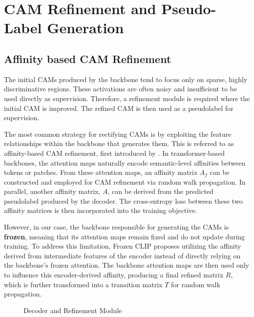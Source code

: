 \section{CAM Refinement and Pseudo-Label Generation}
\label{sec:refinement}
\subsection{Affinity based CAM Refinement}  
The initial CAMs produced by the backbone tend to focus only on sparse, highly discriminative regions. These activations are often noisy and insufficient to be used directly as supervision. Therefore, a refinement module is required where the initial CAM is improved. The refined CAM is then used as a pseudolabel for supervision.  

The most common strategy for rectifying CAMs is by exploiting the feature relationships within the backbone that generates them. This is referred to as affinity-based CAM refinement, first introduced by \cite{wsss_affinitynet}. In transformer-based backbones, the attention maps naturally encode semantic-level affinities between tokens or patches. From these attention maps, an affinity matrix $A_f$ can be constructed and employed for CAM refinement via random walk propagation. In parallel, another affinity matrix, $A$, can be derived from the predicted pseudolabel produced by the decoder. The cross-entropy loss between these two affinity matrices is then incorporated into the training objective.  

However, in our case, the backbone responsible for generating the CAMs is \textbf{frozen}, meaning that its attention maps remain fixed and do not update during training. To address this limitation, Frozen CLIP \cite{wsss_frozen_clip} proposes utilizing the affinity derived from intermediate features of the encoder instead of directly relying on the backbone's frozen attention. The backbone attention maps are then used only to influence this encoder-derived affinity, producing a final refined matrix $R$, which is further transformed into a transition matrix $T$ for random walk propagation.  

\begin{figure}[t]
    \centering
    \caption{Decoder and Refinement Module}
    \label{fig:decoder}
\end{figure}

